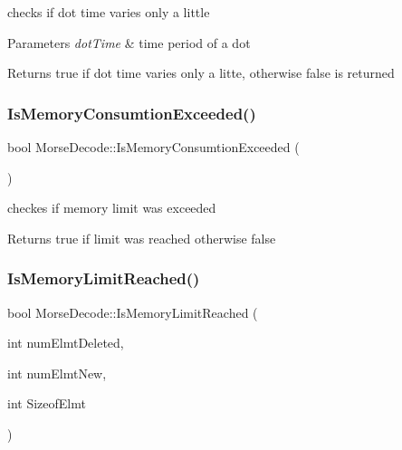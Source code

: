 checks if dot time varies only a little 


\begin{DoxyParams}{Parameters}
{\em dot\+Time} & time period of a dot \\
\hline
\end{DoxyParams}
\begin{DoxyReturn}{Returns}
true if dot time varies only a litte, otherwise false is returned 
\end{DoxyReturn}
\mbox{\label{classMorseDecode_a51cac4ec93e72a092348d09f21bc88c9}} 
\subsubsection{\texorpdfstring{Is\+Memory\+Consumtion\+Exceeded()}{IsMemoryConsumtionExceeded()}}
{\footnotesize\ttfamily bool Morse\+Decode\+::\+Is\+Memory\+Consumtion\+Exceeded (\begin{DoxyParamCaption}{ }\end{DoxyParamCaption})}



checkes if memory limit was exceeded 

\begin{DoxyReturn}{Returns}
true if limit was reached otherwise false 
\end{DoxyReturn}
\mbox{\label{classMorseDecode_a3d3db86f34bbc8524b3b26e439bcb219}} 
\subsubsection{\texorpdfstring{Is\+Memory\+Limit\+Reached()}{IsMemoryLimitReached()}}
{\footnotesize\ttfamily bool Morse\+Decode\+::\+Is\+Memory\+Limit\+Reached (\begin{DoxyParamCaption}\item[{int}]{num\+Elmt\+Deleted,  }\item[{int}]{num\+Elmt\+New,  }\item[{int}]{Sizeof\+Elmt }\end{DoxyParamCaption})\hspace{0.3cm}{\ttfamily [private]}}



